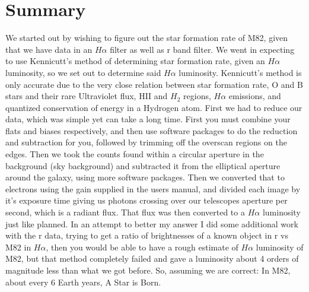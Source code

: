\documentclass[modern]{aastex63}
\begin{document}
\section{Summary}
We started out by wishing to figure out the star formation rate of M82, given that we have data in an $H\alpha$ filter as well as r band filter. We went in expecting to use Kennicutt's method of determining star formation rate, given an $H\alpha$ luminosity, so we set out to determine said $H\alpha$ luminosity. Kennicutt's method is only accurate due to the very close relation between star formation rate, O and B stars and their rare Ultraviolet flux, HII and $H_2$ regions, $H\alpha$ emissions, and quantized conservation of energy in a Hydrogen atom. First we had to reduce our data, which was simple yet can take a long time. First you must combine your flats and biases respectively, and then use software packages to do the reduction and subtraction for you, followed by trimming off the overscan regions on the edges. Then we took the counts found within a circular aperture in the background (sky background) and subtracted it from the elliptical aperture around the galaxy, using more software packages. Then we converted that to electrons using the gain supplied in the users manual, and divided each image by it's exposure time giving us photons crossing over our telescopes aperture per second, which is a radiant flux. That flux was then converted to a $H\alpha$ luminosity just like planned. In an attempt to better my answer I did some additional work with the r data, trying to get a ratio of brightnesses of a known object in r vs M82 in $H\alpha$, then you would be able to have a rough estimate of $H\alpha$ luminosity of M82, but that method completely failed and gave a luminosity about 4 orders of magnitude less than what we got before. So, assuming we are correct: In M82, about every 6 Earth years, A Star is Born.




\end{document}
